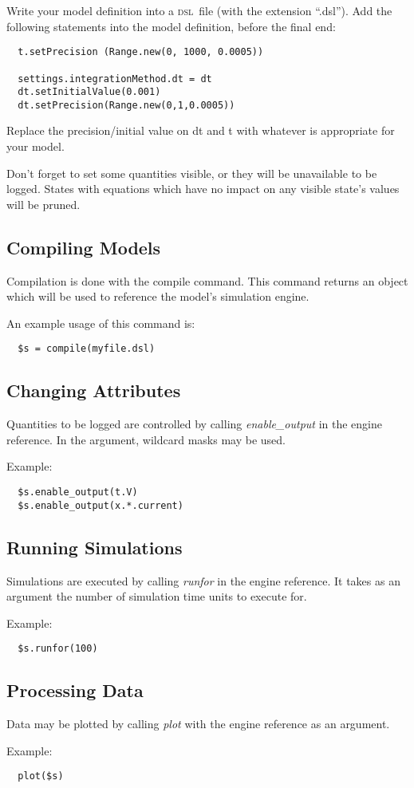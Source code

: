 \documentclass[11pt]{article}
\newcommand{\DSL}{{\scshape dsl}}
\begin{document}
Write your model definition into a \DSL\ file (with the extension
``.dsl'').  Add the following statements into the model definition,
before the final end:

\begin{verbatim}
  t.setPrecision (Range.new(0, 1000, 0.0005))

  settings.integrationMethod.dt = dt
  dt.setInitialValue(0.001)
  dt.setPrecision(Range.new(0,1,0.0005))
\end{verbatim}

Replace the precision/initial value on dt and t with whatever is appropriate for your model.

Don't forget to set some quantities visible, or they will be
unavailable to be logged.  States with equations which have no impact
on any visible state's values will be pruned.

\subsection{Compiling Models}

Compilation is done with the compile command.  This command returns an
object which will be used to reference the model's simulation engine.

An example usage of this command is:

\begin{verbatim}
  $s = compile(myfile.dsl)
\end{verbatim}

\subsection{Changing Attributes}

Quantities to be logged are controlled by calling {\it enable\_output}
in the engine reference.  In the argument, wildcard masks may be used.

Example:

\begin{verbatim}
  $s.enable_output(t.V)
  $s.enable_output(x.*.current)
\end{verbatim}



\subsection{Running Simulations}

Simulations are executed by calling {\it runfor} in the engine
reference.  It takes as an argument the number of simulation time
units to execute for.  

Example:

\begin{verbatim}
  $s.runfor(100)
\end{verbatim}

\subsection{Processing Data}

Data may be plotted by calling {\it plot} with the engine reference as
an argument. 

Example:

\begin{verbatim}
  plot($s)
\end{verbatim}

\end{document}
